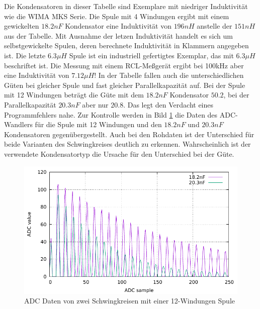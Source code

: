 Die Kondensatoren in dieser Tabelle sind Exemplare mit niedriger Induktivität wie
die WIMA MKS Serie. Die Spule mit 4 Windungen ergibt mit einem gewickelten \(18.2nF\)
Kondensator eine Induktivität von \(196nH\) anstelle der \(151nH\) aus der Tabelle.
Mit Ausnahme der letzen Induktivität handelt es sich um selbstgewickelte Spulen,
deren berechnete Induktivität in Klammern angegeben ist. Die letzte \(6.3\mu H\) Spule
ist ein industriell gefertigtes Exemplar, das mit \(6.3\mu H\) beschriftet ist.
Die Messung mit einem RCL-Meßgerät ergibt bei 100kHz aber eine Induktivität von \(7.12\mu H\)!
In der Tabelle fallen auch die unterschiedlichen Güten bei gleicher Spule und fast gleicher
Parallelkapazität auf. Bei der Spule mit 12 Windungen beträgt die Güte mit dem \(18.2nF\)
Kondensator \(50.2\), bei der Parallelkapazität \(20.3nF\) aber nur \(20.8\).
Das legt den Verdacht eines Programmfehlers nahe.
Zur Kontrolle werden in Bild \ref{fig:W12compare} die Daten des ADC-Wandlers 
für die Spule mit 12 Windungen und den \(18.2nF\) und \(20.3nF\) Kondensatoren gegenübergestellt.
Auch bei den Rohdaten ist der Unterschied für beide Varianten des Schwingkreises deutlich
zu erkennen. Wahrscheinlich ist der verwendete Kondensatortyp die Ursache für den Unterschied
bei der Güte.

\begin{figure}[H]
\centering
\includegraphics[width=16cm]{../GNU/W12compare.pdf}
\caption{ADC Daten von zwei Schwingkreisen mit einer 12-Windungen Spule}
\label{fig:W12compare}
\end{figure}

